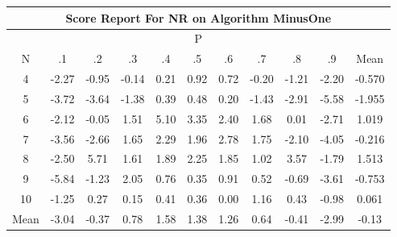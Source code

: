 \documentclass[11pt,a4paper]{report}
\begin{document}
\begin{longtable}{ | c || c | c | c | c | c | c | c | c | c || c |}
\hline
\multicolumn{11}{|c|}{ Score Report For NR on Algorithm MinusOne} \\
\hline
\multicolumn{11}{|c|}{ P } \\
\hline
N & .1 & .2 & .3 & .4 & .5 & .6 & .7 & .8 & .9 & Mean\\
 \hline
 \hline
 \endhead
  4 &  \cellcolor[HTML]{FFC7C7} -2.27 &  \cellcolor[HTML]{FFE7E7} -0.95 &  \cellcolor[HTML]{FFFFFF} -0.14 &  \cellcolor[HTML]{F7F7FF} 0.21 &  \cellcolor[HTML]{E7E7FF} 0.92 &  \cellcolor[HTML]{EFEFFF} 0.72 &  \cellcolor[HTML]{FFF7F7} -0.20 &  \cellcolor[HTML]{FFDFDF} -1.21 &  \cellcolor[HTML]{FFC7C7} -2.20 & -0.570 \\
  5 &  \cellcolor[HTML]{FF9F9F} -3.72 &  \cellcolor[HTML]{FFA7A7} -3.64 &  \cellcolor[HTML]{FFDFDF} -1.38 &  \cellcolor[HTML]{F7F7FF} 0.39 &  \cellcolor[HTML]{EFEFFF} 0.48 &  \cellcolor[HTML]{F7F7FF} 0.20 &  \cellcolor[HTML]{FFD7D7} -1.43 &  \cellcolor[HTML]{FFB7B7} -2.91 &  \cellcolor[HTML]{FF7070} -5.58 & -1.955 \\
  6 &  \cellcolor[HTML]{FFC7C7} -2.12 &  \cellcolor[HTML]{FFFFFF} -0.05 &  \cellcolor[HTML]{D7D7FF} 1.51 &  \cellcolor[HTML]{8080FF} 5.10 &  \cellcolor[HTML]{A7A7FF} 3.35 &  \cellcolor[HTML]{BFBFFF} 2.40 &  \cellcolor[HTML]{D7D7FF} 1.68 &  \cellcolor[HTML]{FFFFFF} 0.01 &  \cellcolor[HTML]{FFB7B7} -2.71 & 1.019 \\
  7 &  \cellcolor[HTML]{FFA7A7} -3.56 &  \cellcolor[HTML]{FFBFBF} -2.66 &  \cellcolor[HTML]{D7D7FF} 1.65 &  \cellcolor[HTML]{C7C7FF} 2.29 &  \cellcolor[HTML]{CFCFFF} 1.96 &  \cellcolor[HTML]{B7B7FF} 2.78 &  \cellcolor[HTML]{CFCFFF} 1.75 &  \cellcolor[HTML]{FFC7C7} -2.10 &  \cellcolor[HTML]{FF9797} -4.05 & -0.216 \\
  8 &  \cellcolor[HTML]{FFBFBF} -2.50 &  \cellcolor[HTML]{7070FF} 5.71 &  \cellcolor[HTML]{D7D7FF} 1.61 &  \cellcolor[HTML]{CFCFFF} 1.89 &  \cellcolor[HTML]{C7C7FF} 2.25 &  \cellcolor[HTML]{CFCFFF} 1.85 &  \cellcolor[HTML]{E7E7FF} 1.02 &  \cellcolor[HTML]{A7A7FF} 3.57 &  \cellcolor[HTML]{FFCFCF} -1.79 & 1.513 \\
  9 &  \cellcolor[HTML]{FF7070} -5.84 &  \cellcolor[HTML]{FFDFDF} -1.23 &  \cellcolor[HTML]{CFCFFF} 2.05 &  \cellcolor[HTML]{EFEFFF} 0.76 &  \cellcolor[HTML]{F7F7FF} 0.35 &  \cellcolor[HTML]{E7E7FF} 0.91 &  \cellcolor[HTML]{EFEFFF} 0.52 &  \cellcolor[HTML]{FFEFEF} -0.69 &  \cellcolor[HTML]{FFA7A7} -3.61 & -0.753 \\
  10 &  \cellcolor[HTML]{FFDFDF} -1.25 &  \cellcolor[HTML]{F7F7FF} 0.27 &  \cellcolor[HTML]{FFFFFF} 0.15 &  \cellcolor[HTML]{F7F7FF} 0.41 &  \cellcolor[HTML]{F7F7FF} 0.36 &  \cellcolor[HTML]{FFFFFF} 0.00 &  \cellcolor[HTML]{DFDFFF} 1.16 &  \cellcolor[HTML]{F7F7FF} 0.43 &  \cellcolor[HTML]{FFE7E7} -0.98 & 0.061 \\
 \hline
 \hline
Mean &  \cellcolor[HTML]{FFAFAF} -3.04 &  \cellcolor[HTML]{FFF7F7} -0.37 &  \cellcolor[HTML]{EFEFFF} 0.78 &  \cellcolor[HTML]{D7D7FF} 1.58 &  \cellcolor[HTML]{DFDFFF} 1.38 &  \cellcolor[HTML]{DFDFFF} 1.26 &  \cellcolor[HTML]{EFEFFF} 0.64 &  \cellcolor[HTML]{FFF7F7} -0.41 &  \cellcolor[HTML]{FFB7B7} -2.99 &  \cellcolor[HTML]{FFFFFF} -0.13
\end{longtable}
\end{document}
